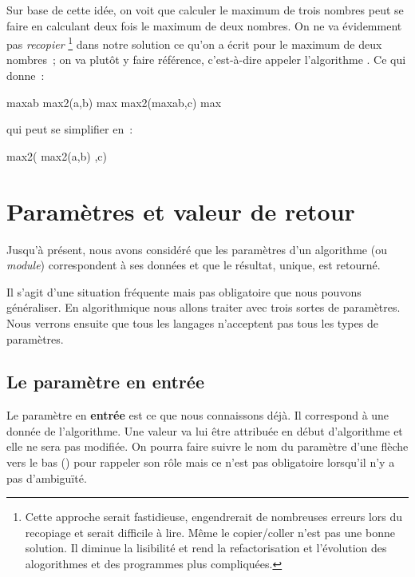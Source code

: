 	Sur base de cette idée, 
	on voit que calculer le maximum de trois nombres
	peut se faire en calculant deux fois le maximum de deux nombres.
	On ne va évidemment pas \emph{recopier}%
	\footnote{
		Cette approche serait fastidieuse,
		engendrerait de nombreuses erreurs lors du recopiage
		et serait difficile à lire. Même le copier/coller n'est pas une bonne 
		solution. Il diminue la lisibilité et rend la refactorisation et 
		l'évolution des alogorithmes et des programmes plus compliquées.
	} dans notre solution
	ce qu’on a écrit pour le maximum de deux nombres~;
	on va plutôt y faire référence, 
	c’est-à-dire appeler l’algorithme . 
	Ce qui donne~:

	\begin{pseudocode}
		\Let maxab \Gets max2(a,b)
		\Let max \Gets max2(maxab,c)
		\Return max
	\EndAlgo
	\end{pseudocode}

	qui peut se simplifier en~:
	
	\begin{pseudocode}
	\Algo{max3}{\Par{a,b,c}{reals}}{real}
		\Return max2( max2(a,b) ,c)
	\EndAlgo
	\end{pseudocode}

\section{Paramètres et valeur de retour}

	Jusqu’à présent, nous avons considéré que les paramètres d’un algorithme (ou
	\emph{module}) correspondent à ses données et que le résultat,
	unique, est retourné.

	Il s’agit d’une situation fréquente mais pas obligatoire que nous pouvons
	généraliser.  En algorithmique nous allons traiter avec trois sortes de 
	paramètres. Nous verrons ensuite que tous les langages n'acceptent pas tous 
	les types de paramètres. 

	\subsection{Le paramètre en entrée}
	\label{param.entrée}

		Le paramètre en \textbf{entrée} est ce que nous connaissons déjà.  Il
		correspond à une donnée de l’algorithme.  Une valeur va lui être
		attribuée en début d’algorithme et elle ne sera pas modifiée.  On pourra
		faire suivre le nom du paramètre d’une flèche vers le bas (\In) pour
		rappeler son rôle mais ce n'est pas obligatoire lorsqu'il n'y a pas
		d'ambiguïté.
		
